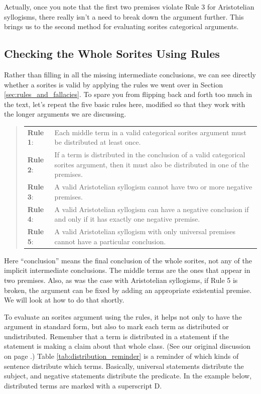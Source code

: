 Actually, once you note that the first two premises violate Rule 3 for Aristotelian syllogisms, there really isn't a need to break down the argument further. This brings us to the second method for evaluating sorites categorical arguments. 

\subsection{Checking the Whole Sorites Using Rules}

Rather than filling in all the missing intermediate conclusions, we can see directly whether a sorites is valid by applying the rules we went over in Section  \ref{sec:rules_and_fallacies}. To spare you from flipping back and forth too much in the text, let's repeat the five basic rules here, modified so that they work with the longer arguments we are discussing. 

\begin{quotation}
\begin{tabu}{p{.1\linewidth}p{.9\linewidth}}
\textbf{Rule 1}: & Each middle term in a valid categorical sorites argument must be distributed at least once. \\
\textbf{Rule 2}: & If a term is distributed in the conclusion of a valid categorical sorites argument, then it must also be distributed in one of the premises. \\ 
\textbf{Rule 3}: & A valid Aristotelian syllogism cannot have two or more negative premises. \\
\textbf{Rule 4}: & A valid Aristotelian syllogism can have a negative conclusion if and only if it has exactly one negative premise.\\
\textbf{Rule 5}: & A valid Aristotelian syllogism with only universal premises cannot have a particular conclusion.
\end{tabu}
\end{quotation}

Here ``conclusion'' means the final conclusion of the whole sorites, not any of the implicit intermediate conclusions. The middle terms are the ones that appear in two premises. Also, as was the case with Aristotelian syllogisms, if Rule 5 is broken, the argument can be fixed by adding an appropriate existential premise. We will look at how to do that shortly. 

To evaluate an sorites argument using the rules, it helps not only to have the argument in standard form, but also to mark each term as distributed or undistributed. Remember that a term is distributed in a statement if the statement is making a claim about that whole class. (See our original discussion on page \pageref{def:Distribution}.) Table \ref{tab:distribution_reminder} is a reminder of which kinds of sentence distribute which terms. Basically, universal statements distribute the subject, and negative statements distribute the predicate. In the example below, distributed terms are marked with a superscript D. 

